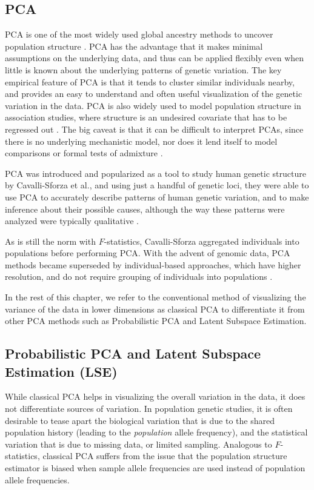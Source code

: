 \documentclass[12pt]{article}
\begin{document}
\subsection{PCA}
PCA is one of the most widely used global ancestry methods to uncover population structure \citep{cavalli-sforza_analysis_1975, mcvean_genealogical_2009, engelhardt_analysis_2010}. PCA has the advantage that it makes minimal assumptions on the underlying data, and thus can be applied flexibly even when little is known about the underlying patterns of genetic variation. The key empirical feature of PCA is that it tends to cluster similar individuals nearby, and provides an easy to understand and often useful visualization of the genetic variation in the data. PCA is also widely used to model population structure in association studies, where structure is an undesired covariate that has to be regressed out \citep{price_principal_2006}. The big caveat is that it can be difficult to interpret PCAs, since there is no underlying mechanistic model, nor does it lend itself to model comparisons or formal tests of admixture \citep{mcvean_genealogical_2009, novembre_interpreting_2008}.


PCA was introduced and popularized as a tool to study human genetic structure by Cavalli-Sforza et al., and using just a handful of genetic loci, they were able to use PCA to accurately describe patterns of human genetic variation, and to make inference about their possible causes, although the way these patterns were analyzed were typically qualitative \citep{menozzi_synthetic_1978, sforza_great_1995, l_l_cavalli-sforza_history_1996}.

As is still the norm with $F$-statistics, Cavalli-Sforza aggregated individuals into populations before performing PCA. With the advent of genomic data, PCA methods became superseded by individual-based approaches, which have higher resolution, and do not require grouping of individuals into populations \citep{patterson_population_2006, novembre_genes_2008, price_principal_2006}.

In the rest of this chapter, we refer to the conventional method of visualizing the variance of the data in lower dimensions as classical PCA to differentiate it from other PCA methods such as Probabilistic PCA and Latent Subspace Estimation.

\subsection{Probabilistic PCA and Latent Subspace Estimation (LSE)}
While classical PCA helps in visualizing the overall variation in the data, it does not differentiate sources of variation. In population genetic studies, it is often desirable to tease apart the biological variation that is due to the shared population history (leading to the \textit{population} allele frequency), and the statistical variation that is due to missing data, or limited sampling. Analogous to $F$-statistics, classical PCA suffers from the issue that the population structure estimator is biased when sample allele frequencies are used instead of population allele frequencies.
\end{document}
